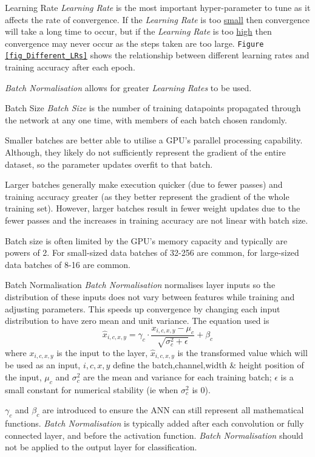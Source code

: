 \documentclass[11pt,a4paper]{article}
\begin{document}
  \begin{proposition}{Learning Rate}
    \textit{Learning Rate} is the most important hyper-parameter to tune as it affects the rate of convergence. If the \textit{Learning Rate} is too \underline{small} then convergence will take a long time to occur, but if the \textit{Learning Rate} is too \underline{high} then convergence may never occur as the steps taken are too large. \texttt{Figure \ref{fig_Different_LRs}} shows the relationship between different learning rates and training accuracy after each epoch.
    \par \textit{Batch Normalisation} allows for greater \textit{Learning Rates} to be used.
  \end{proposition}

  \begin{proposition}{Batch Size}
    \textit{Batch Size} is the number of training datapoints propagated through the network at any one time, with members of each batch chosen randomly.
    \par Smaller batches are better able to utilise a GPU's parallel processing capability. Although, they likely do not sufficiently represent the gradient of the entire dataset, so the parameter updates overfit to that batch.
    \par Larger batches generally make execution quicker (due to fewer passes) and training accuracy greater (as they better represent the gradient of the whole training set). However, larger batches result in fewer weight updates due to the fewer passes and the increases in training accuracy are not linear with batch size.
    \par Batch size is often limited by the GPU's memory capacity and typically are powers of 2. For small-sized data batches of 32-256 are common, for large-sized data batches of 8-16 are common.
  \end{proposition}

  \begin{definition}{Batch Normalisation}
    \textit{Batch Normalisation} normalises layer inputs so the distribution of these inputs does not vary between features while training and adjusting parameters. This speeds up convergence by changing each input distribution to have zero mean and unit variance. The equation used is
    \[ \hat{x}_{i,c,x,y}=\gamma_c\cdot\frac{x_{i,c,x,y}-\mu_c}{\sqrt{\sigma^2_c+\epsilon}}+\beta_c \]
    where $x_{i,c,x,y}$ is the input to the layer, $\hat{x}_{i,c,x,y}$ is the transformed value which will be used as an input, $i,c,x,y$ define the batch,channel,width \& height position of the input, $\mu_c$ and $\sigma^2_c$ are the mean and variance for each training batch; $\epsilon$ is a small constant for numerical stability (ie when $\sigma^2_c$ is 0).
    \par $\gamma_c$ and $\beta_c$ are introduced to ensure the ANN can still represent all mathematical functions.
    \textit{Batch Normalisation} is typically added after each convolution or fully connected layer, and before the activation function. \textit{Batch Normalisation} should not be applied to the output layer for classification.
  \end{definition}
\end{document}

